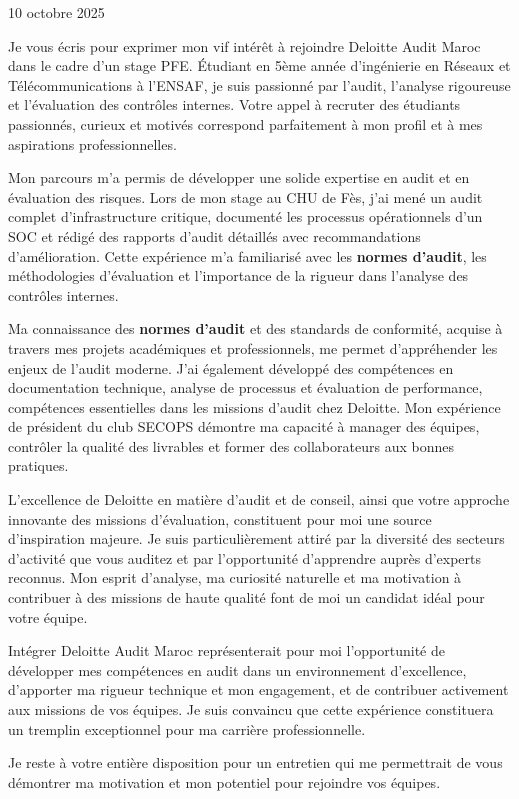\documentclass[11pt, a4paper]{../../awesome-cv}
\begin{document}
\makecvheader[R]

\makecvfooter
{10 octobre 2025}
{}
{}

\makelettertitle

\begin{cvletter}

    Je vous écris pour exprimer mon vif intérêt à rejoindre Deloitte Audit Maroc dans le cadre d'un stage PFE. Étudiant en 5ème année d'ingénierie en Réseaux et Télécommunications à l'ENSAF, je suis passionné par l'audit, l'analyse rigoureuse et l'évaluation des contrôles internes. Votre appel à recruter des étudiants passionnés, curieux et motivés correspond parfaitement à mon profil et à mes aspirations professionnelles.

    Mon parcours m'a permis de développer une solide expertise en audit et en évaluation des risques. Lors de mon stage au CHU de Fès, j'ai mené un audit complet d'infrastructure critique, documenté les processus opérationnels d'un SOC et rédigé des rapports d'audit détaillés avec recommandations d'amélioration. Cette expérience m'a familiarisé avec les \textbf{normes d'audit}, les méthodologies d'évaluation et l'importance de la rigueur dans l'analyse des contrôles internes.

    Ma connaissance des \textbf{normes d'audit} et des standards de conformité, acquise à travers mes projets académiques et professionnels, me permet d'appréhender les enjeux de l'audit moderne. J'ai également développé des compétences en documentation technique, analyse de processus et évaluation de performance, compétences essentielles dans les missions d'audit chez Deloitte. Mon expérience de président du club SECOPS démontre ma capacité à manager des équipes, contrôler la qualité des livrables et former des collaborateurs aux bonnes pratiques.

    L'excellence de Deloitte en matière d'audit et de conseil, ainsi que votre approche innovante des missions d'évaluation, constituent pour moi une source d'inspiration majeure. Je suis particulièrement attiré par la diversité des secteurs d'activité que vous auditez et par l'opportunité d'apprendre auprès d'experts reconnus. Mon esprit d'analyse, ma curiosité naturelle et ma motivation à contribuer à des missions de haute qualité font de moi un candidat idéal pour votre équipe.

    Intégrer Deloitte Audit Maroc représenterait pour moi l'opportunité de développer mes compétences en audit dans un environnement d'excellence, d'apporter ma rigueur technique et mon engagement, et de contribuer activement aux missions de vos équipes. Je suis convaincu que cette expérience constituera un tremplin exceptionnel pour ma carrière professionnelle.

    Je reste à votre entière disposition pour un entretien qui me permettrait de vous démontrer ma motivation et mon potentiel pour rejoindre vos équipes.

\end{cvletter}

\makeletterclosing
\end{document}
